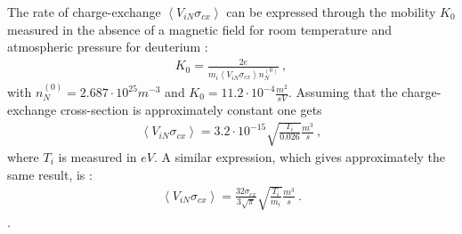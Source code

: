 \documentclass[a4paper,10pt]{report}
\begin{document}
The rate of charge-exchange $\left\langle V_{iN} \sigma_{cx} \right\rangle$ can
be expressed through the mobility $K_0$ measured in the absence of a
magnetic field for room temperature and atmospheric pressure for
deuterium \cite{MCDANIEL73A}:
\begin{gather}
K_0 =
\frac{2 e}{m_i \left\langle V_{iN} \sigma_{cx} \right\rangle n_N^{\left(0\right)}}
~,
\end{gather}
with $n_N^{\left(0\right)} = 2.687 \cdot 10^{25} m^{-3}$ and
$K_0 = 11.2 \cdot 10^{-4} \frac{m^2}{s V}$.
Assuming that the charge-exchange cross-section is approximately constant
one gets
\begin{gather}
\left\langle V_{iN} \sigma_{cx} \right\rangle = 3.2 \cdot 10^{-15} \sqrt{\frac{T_i}{0.026}}
\frac{m^3}{s}
~,
\end{gather}
where $T_i$ is measured in $eV$. A similar expression, which gives approximately
the same result, is \cite{ROZ88A}:
\begin{gather}
\left\langle V_{iN} \sigma_{cx} \right\rangle = \frac{32 \sigma _{cx}}{3 \sqrt{\pi}}
\sqrt{\frac{T_i}{m_i}}
\frac{m^3}{s}
~.
\end{gather}.
\end{document}
